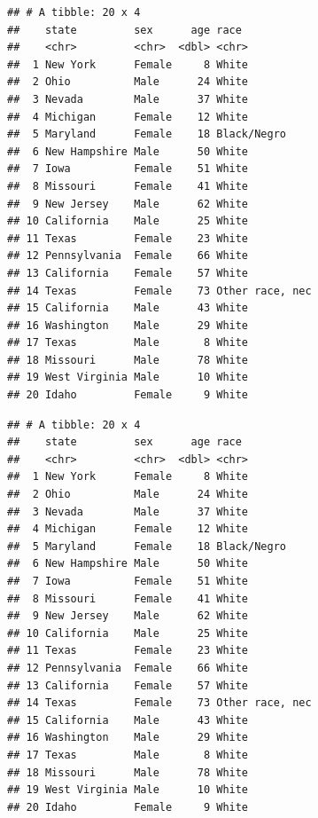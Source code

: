 \documentclass[]{book}
\newenvironment{Shaded}{\begin{snugshade}}{\end{snugshade}}
\newcommand{\KeywordTok}[1]{\textcolor[rgb]{0.13,0.29,0.53}{\textbf{#1}}}
\newcommand{\DecValTok}[1]{\textcolor[rgb]{0.00,0.00,0.81}{#1}}
\newcommand{\StringTok}[1]{\textcolor[rgb]{0.31,0.60,0.02}{#1}}
\newcommand{\OperatorTok}[1]{\textcolor[rgb]{0.81,0.36,0.00}{\textbf{#1}}}
\newcommand{\NormalTok}[1]{#1}
\theoremstyle{definition}
\theoremstyle{definition}
\theoremstyle{definition}
\theoremstyle{remark}
\begin{document}
\begin{verbatim}
## # A tibble: 20 x 4
##    state         sex      age race           
##    <chr>         <chr>  <dbl> <chr>          
##  1 New York      Female     8 White          
##  2 Ohio          Male      24 White          
##  3 Nevada        Male      37 White          
##  4 Michigan      Female    12 White          
##  5 Maryland      Female    18 Black/Negro    
##  6 New Hampshire Male      50 White          
##  7 Iowa          Female    51 White          
##  8 Missouri      Female    41 White          
##  9 New Jersey    Male      62 White          
## 10 California    Male      25 White          
## 11 Texas         Female    23 White          
## 12 Pennsylvania  Female    66 White          
## 13 California    Female    57 White          
## 14 Texas         Female    73 Other race, nec
## 15 California    Male      43 White          
## 16 Washington    Male      29 White          
## 17 Texas         Male       8 White          
## 18 Missouri      Male      78 White          
## 19 West Virginia Male      10 White          
## 20 Idaho         Female     9 White
\end{verbatim}

\begin{Shaded}
\end{Shaded}

\begin{verbatim}
## # A tibble: 20 x 4
##    state         sex      age race           
##    <chr>         <chr>  <dbl> <chr>          
##  1 New York      Female     8 White          
##  2 Ohio          Male      24 White          
##  3 Nevada        Male      37 White          
##  4 Michigan      Female    12 White          
##  5 Maryland      Female    18 Black/Negro    
##  6 New Hampshire Male      50 White          
##  7 Iowa          Female    51 White          
##  8 Missouri      Female    41 White          
##  9 New Jersey    Male      62 White          
## 10 California    Male      25 White          
## 11 Texas         Female    23 White          
## 12 Pennsylvania  Female    66 White          
## 13 California    Female    57 White          
## 14 Texas         Female    73 Other race, nec
## 15 California    Male      43 White          
## 16 Washington    Male      29 White          
## 17 Texas         Male       8 White          
## 18 Missouri      Male      78 White          
## 19 West Virginia Male      10 White          
## 20 Idaho         Female     9 White
\end{verbatim}
\end{document}
